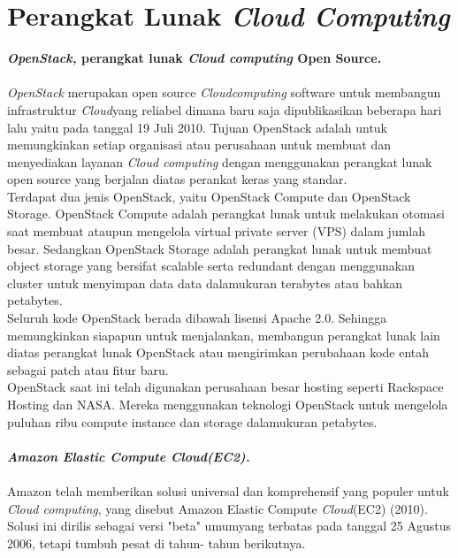 \section{Perangkat Lunak \textit{Cloud Computing}}
\textbf{\textit{OpenStack,} perangkat lunak \textit{Cloud computing} Open  Source.}\\\\
\textit{OpenStack} merupakan open source \textit{\textit{\textit{Cloud}computing}} software untuk membangun infrastruktur \textit{Cloud}yang reliabel dimana baru saja dipublikasikan beberapa hari lalu yaitu pada tanggal 19 Juli 2010. Tujuan OpenStack adalah untuk memungkinkan setiap organisasi atau perusahaan untuk membuat dan menyediakan layanan \textit{Cloud computing} dengan menggunakan perangkat lunak open source yang berjalan diatas perankat keras yang standar.\\
\tab Terdapat dua jenis OpenStack, yaitu OpenStack Compute dan OpenStack Storage. OpenStack Compute adalah perangkat lunak untuk melakukan otomasi saat membuat ataupun mengelola virtual private server (VPS) dalam jumlah besar. Sedangkan OpenStack Storage adalah perangkat lunak untuk membuat object storage yang bersifat scalable serta redundant dengan menggunakan cluster untuk menyimpan data data dalamukuran terabytes atau bahkan petabytes.\\
Seluruh kode OpenStack berada dibawah lisensi Apache 2.0. Sehingga  memungkinkan siapapun untuk menjalankan, membangun perangkat lunak lain diatas perangkat lunak OpenStack atau mengirimkan perubahaan kode entah sebagai  patch atau fitur baru.\\
\tab OpenStack saat ini telah digunakan perusahaan besar hosting seperti  Rackspace Hosting dan NASA. Mereka menggunakan teknologi OpenStack untuk mengelola puluhan ribu compute instance dan storage dalamukuran petabytes.\\\\
\textbf{\textit{Amazon Elastic Compute \textit{Cloud}(EC2).}}\\\\
Amazon telah memberikan solusi universal dan komprehensif yang populer untuk \textit{Cloud computing}, yang disebut Amazon Elastic Compute \textit{Cloud}(EC2) (2010). Solusi ini dirilis sebagai versi "beta" umumyang terbatas pada tanggal 25 Agustus 2006, tetapi tumbuh pesat di tahun- tahun berikutnya.\\
